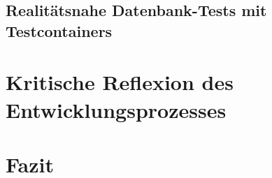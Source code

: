 


\subsection{Realitätsnahe Datenbank-Tests mit Testcontainers}



\clearpage


\section{Kritische Reflexion des Entwicklungsprozesses}



\clearpage


\section{Fazit}



